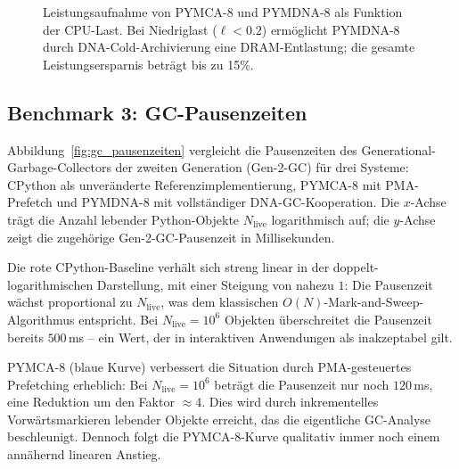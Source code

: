 ﻿\documentclass[a4paper,12pt]{article}
\theoremstyle{definition}
\begin{document}
\begin{figure}[H]
  \centering
  \caption{Leistungsaufnahme von PYMCA-8 und PYMDNA-8 als Funktion der CPU-Last.
    Bei Niedriglast ($\ell < 0.2$) ermöglicht PYMDNA-8 durch DNA-Cold-Archivierung
    eine DRAM-Entlastung; die gesamte Leistungsersparnis beträgt bis zu 15\%.}
  \label{fig:energie_vergleich}
\end{figure}

\subsection{Benchmark 3: GC-Pausenzeiten}

Abbildung~\ref{fig:gc_pausenzeiten} vergleicht die Pausenzeiten des Generational-Garbage-Collectors der zweiten Generation (Gen-2-GC) für drei Systeme: CPython als unveränderte Referenzimplementierung, PYMCA-8 mit PMA-Prefetch und PYMDNA-8 mit vollständiger DNA-GC-Kooperation. Die $x$-Achse trägt die Anzahl lebender Python-Objekte $N_{\mathrm{live}}$ logarithmisch auf; die $y$-Achse zeigt die zugehörige Gen-2-GC-Pausenzeit in Millisekunden.

Die rote CPython-Baseline verhält sich streng linear in der doppelt-logarithmischen Darstellung, mit einer Steigung von nahezu $1$: Die Pausenzeit wächst proportional zu $N_{\mathrm{live}}$, was dem klassischen $O(N)$-Mark-and-Sweep-Algorithmus entspricht. Bei $N_{\mathrm{live}} = 10^6$ Objekten überschreitet die Pausenzeit bereits $500$\,ms -- ein Wert, der in interaktiven Anwendungen als inakzeptabel gilt.

PYMCA-8 (blaue Kurve) verbessert die Situation durch PMA-gesteuertes Prefetching erheblich: Bei $N_{\mathrm{live}} = 10^6$ beträgt die Pausenzeit nur noch $120$\,ms, eine Reduktion um den Faktor $\approx 4$. Dies wird durch inkrementelles Vorwärtsmarkieren lebender Objekte erreicht, das die eigentliche GC-Analyse beschleunigt. Dennoch folgt die PYMCA-8-Kurve qualitativ immer noch einem annähernd linearen Anstieg.
\end{document}
